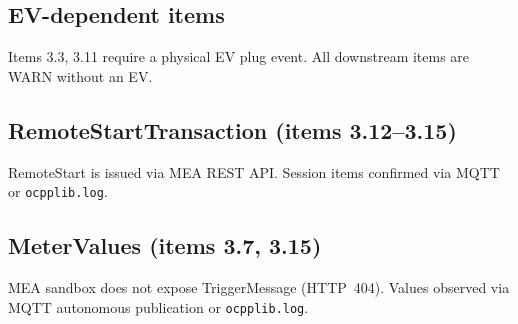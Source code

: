 \documentclass[10pt, a4paper]{article}
\begin{document}
\subsection*{EV-dependent items}
Items 3.3, 3.11 require a physical EV plug event. All downstream items are WARN without an EV.

\subsection*{RemoteStartTransaction (items 3.12--3.15)}
RemoteStart is issued via MEA REST API. Session items confirmed via MQTT or \texttt{ocpplib.log}.

\subsection*{MeterValues (items 3.7, 3.15)}
MEA sandbox does not expose TriggerMessage (HTTP~404).
Values observed via MQTT autonomous publication or \texttt{ocpplib.log}.
\end{document}
